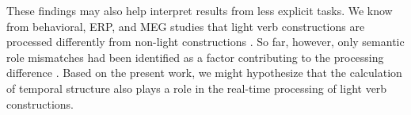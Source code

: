 \documentclass[review,12pt,authoryear]{elsarticle}
\begin{document}
These findings may also help interpret results from less explicit tasks. We know from behavioral, ERP, and MEG studies that light verb constructions are processed differently from non-light constructions \citep{wittenberg2014b,wittenberg2011,Briem2009,Pinangoinpress}. So far, however, only semantic role mismatches had been identified as a factor contributing to the processing difference \citep{wittenberg2014sorting,Wittenbergunderreview}. Based on the present work, we might hypothesize that the calculation of temporal structure also plays a role in the real-time processing of light verb constructions.


\end{document}
